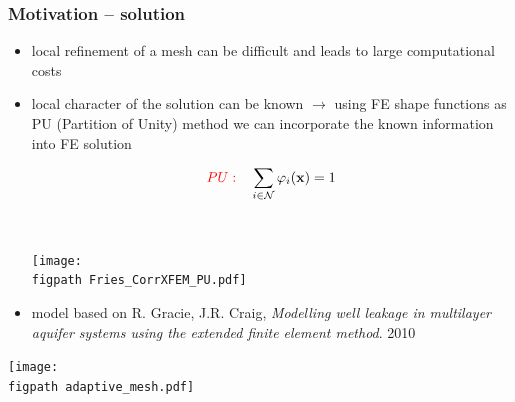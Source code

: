 \documentclass[10pt, xcolor=dvipsnames]{beamer} %
\def\phi{\varphi}
\newcommand{\figpath}{../graphics/}
\begin{document}
\begin{frame}
  \frametitle{Motivation -- solution}
  
  \begin{itemize}
  \setlength{\itemsep}{18pt}
    \item<1-> local refinement of a mesh can be difficult and leads to large computational costs

    \item<2-> local character of the solution can be known \newline  
          $\rightarrow$ using FE shape functions as PU (Partition of Unity) method we 
          can incorporate the known information into FE solution
          
          \begin{minipage}{0.45\textwidth}
            \begin{equation*}
              {\color{red}PU:} \quad  \sum \limits_{i\in\mathcal{N}} \phi_i(\mathbf{x})=1
            \end{equation*}
          \end{minipage}
          ~
          \begin{minipage}{0.45\textwidth}
            \vspace{5pt}
            \texttt{[image: \\figpath Fries\_CorrXFEM\_PU.pdf]}
          \end{minipage}
    \item<2-> \vspace{-0.5cm} model based on
          \newline 
          \small{ \newline R. Gracie, J.R. Craig, \emph{Modelling well leakage in multilayer aquifer systems using the extended finite element method}. 2010}
  \end{itemize}
  
  \begin{overlayarea}{\linewidth}{8cm}
    {
        \vspace{-6.5cm}
        \centering 
        \texttt{[image: \\figpath adaptive\_mesh.pdf]}
    }
  \end{overlayarea}
\end{frame}
\end{document}
